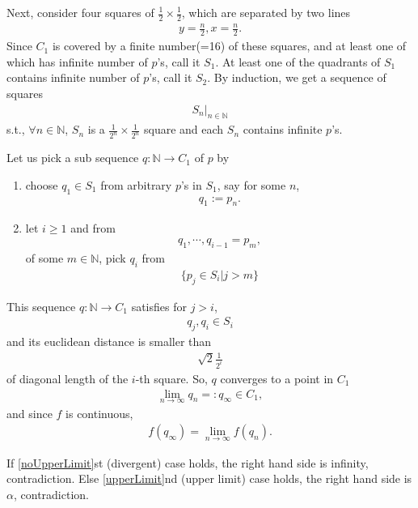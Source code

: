\documentclass[11pt]{book}
\begin{document}
Next, consider four squares of $\frac{1}{2} \times \frac{1}{2}$, which are separated by two lines
\begin{eqnarray}
y = \frac{n}{2}, x = \frac{n}{2}.
\end{eqnarray}
Since $C_1$ is covered by a finite number(=16) of these squares, and at least one of which has infinite number of $p$'s, call it $S_1$.
At least one of the quadrants of $S_1$ contains infinite number of $p$'s, call it $S_2$.
By induction, we get a sequence of squares
\begin{eqnarray}
\left. S_n \right|_{n \in \mathbb{N}}
\end{eqnarray}
s.t., $\forall n \in \mathbb{N}$, $S_n$ is a $\frac{1}{2^n} \times \frac{1}{2^n}$ square and each $S_n$ contains infinite $p$'s.

Let us pick a sub sequence $q : \mathbb{N} \to C_1$ of $p$ by
\begin{enumerate}
\item choose $q_1 \in S_1$ from arbitrary $p$'s in $S_1$, say for some $n$,
\begin{eqnarray}
q_1 := p_n.
\end{eqnarray}

\item let $i \geq 1$ and from
\begin{eqnarray}
q_1, \cdots, q_{i-1} = p_{m},
\end{eqnarray}
of some $m \in \mathbb{N}$, pick $q_i$ from
\begin{eqnarray}
\{p_j  \in S_i | j > m  \}
\end{eqnarray}

\end{enumerate}

This sequence $q : \mathbb{N} \to C_1$ satisfies for $j>i$,
\begin{eqnarray}
q_j, q_i \in S_i
\end{eqnarray}
and its euclidean distance is smaller than 
\begin{eqnarray}
\sqrt{2} \frac{1}{2^i}
\end{eqnarray}
of diagonal length of the $i$-th square.
So, $q$ converges to a point in $C_1$
\begin{eqnarray}
\lim_{n\to \infty} q_n =: q_\infty \in C_1,
\end{eqnarray}
and since $f$ is continuous,
\begin{eqnarray}
f(q_\infty) = \lim_{n\to \infty} f(q_n).
\end{eqnarray}

If \ref{noUpperLimit}st (divergent) case holds, the right hand side is infinity, contradiction.
Else \ref{upperLimit}nd (upper limit) case holds, the right hand side is $\alpha$, contradiction.
\end{document}

